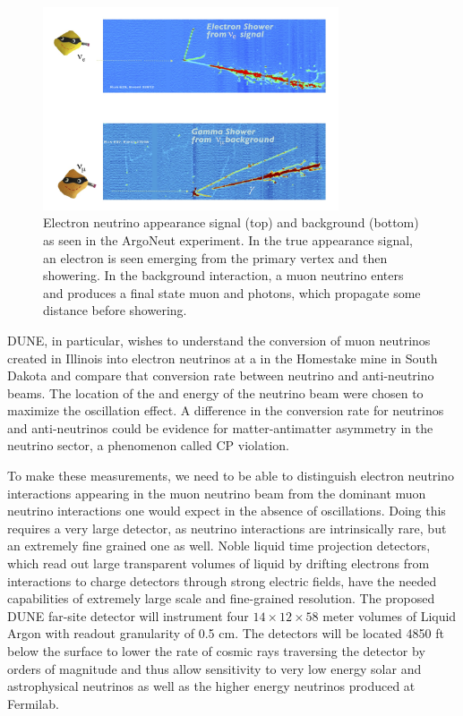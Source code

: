 \begin{figure}[h]
    \centering
\includegraphics[trim={0cm 0.6cm 2.5cm 0.7cm},clip,height=6cm]{graphics/IntroFigures/Fig_02_Argoneut.jpg}    \caption{Electron neutrino appearance signal (top) and background (bottom) as seen in the ArgoNeut experiment.  In the true appearance signal, an electron is seen emerging from the primary vertex and then showering.  In the background interaction, a muon neutrino enters and  produces a final state muon and photons, which propagate some distance before showering.}
    \label{fig:Argoneut}
\end{figure}

DUNE,  in particular,   wishes to understand the conversion of muon neutrinos created in Illinois into electron neutrinos at a  in the Homestake mine in South Dakota and compare that conversion rate between neutrino and anti-neutrino beams. The location of the  and energy of the neutrino beam were chosen to maximize the oscillation effect.   A difference in the conversion rate for neutrinos and anti-neutrinos could be evidence for matter-antimatter asymmetry in the neutrino sector, a phenomenon called CP violation.  

To make these measurements, we need to be able to distinguish electron neutrino interactions appearing in the muon neutrino beam from the dominant muon neutrino interactions one would expect in the absence of oscillations.  Doing this requires a very large detector, as neutrino interactions are intrinsically rare, but an extremely  fine grained one as well.  Noble liquid time projection detectors, which read out large transparent volumes of liquid by drifting electrons from interactions to charge detectors through strong electric fields, have the needed capabilities of extremely large scale and fine-grained resolution. The proposed DUNE far-site detector will instrument four  $14\times12 \times58$ meter volumes of Liquid Argon with readout granularity of 0.5 cm.  The detectors will be located 4850 ft below the surface to lower the rate of cosmic rays traversing the detector by orders of magnitude and thus allow sensitivity to very low energy solar and astrophysical neutrinos as well as the higher energy neutrinos produced at Fermilab. 




